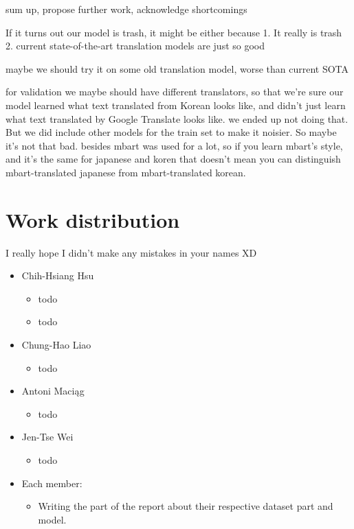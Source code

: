 \documentclass[twocolumn]{article}
\begin{document}
sum up, propose further work, acknowledge shortcomings

If it turns out our model is trash, it might be either because 1. It really is trash 2. current state-of-the-art translation models are just so good

maybe we should try it on some old translation model, worse than current SOTA

for validation we maybe should have different translators, so that we're sure our model learned what text translated from Korean looks like, and didn't just learn what text translated by Google Translate looks like.
we ended up not doing that. But we did include other models for the train set to make it noisier. So maybe it’s not that bad. besides mbart was used for a lot, so if you learn mbart's style, and it's the same for japanese and koren that doesn't mean you can distinguish mbart-translated japanese from mbart-translated korean.


\section*{Work distribution}

I really hope I didn't make any mistakes in your names XD

\begin{itemize}
	\item Chih-Hsiang Hsu
	\begin{itemize}
		\item todo
		\item todo
	\end{itemize}
	
	\item Chung-Hao Liao
	\begin{itemize}
		\item todo
	\end{itemize}
	
	\item Antoni Maciąg
	\begin{itemize}
		\item todo
	\end{itemize}
	
	\item Jen-Tse Wei
	\begin{itemize}
		\item todo
	\end{itemize}
	
	\item Each member:
	\begin{itemize}
		\item Writing the part of the report about their respective dataset part and model.
	\end{itemize}
\end{itemize}
\end{document}
